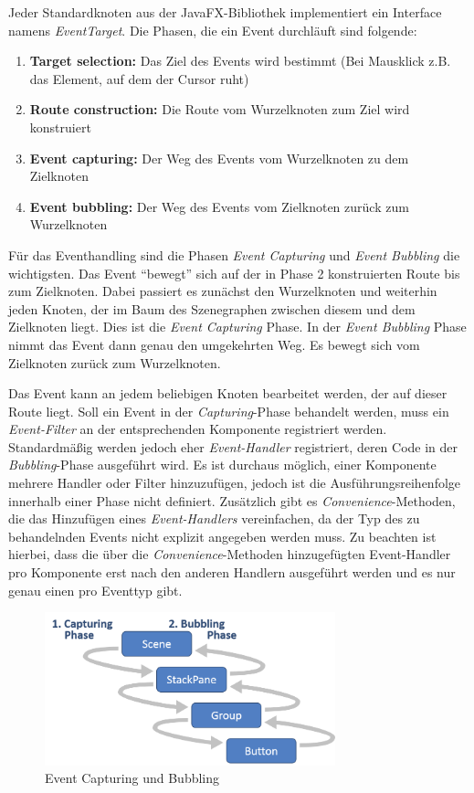 Jeder Standardknoten aus der JavaFX-Bibliothek implementiert ein Interface namens \textit{EventTarget}. Die Phasen, die ein Event durchläuft sind folgende:
\begin{enumerate}
	\item \textbf{Target selection:} Das Ziel des Events wird bestimmt (Bei Mausklick z.B. das Element, auf dem der Cursor ruht)
	\item \textbf{Route construction:} Die Route vom Wurzelknoten zum Ziel wird konstruiert
	\item \textbf{Event capturing:} Der Weg des Events vom Wurzelknoten zu dem Zielknoten
	\item \textbf{Event bubbling:} Der Weg des Events vom Zielknoten zurück zum Wurzelknoten
\end{enumerate}
Für das Eventhandling sind die Phasen \textit{Event Capturing} und \textit{Event Bubbling} die wichtigsten. Das Event \enquote{bewegt} sich auf der in Phase 2 konstruierten Route bis zum Zielknoten. Dabei passiert es zunächst den Wurzelknoten und weiterhin jeden Knoten, der im Baum des Szenegraphen zwischen diesem und dem Zielknoten liegt. Dies ist die \textit{Event Capturing} Phase. In der \textit{Event Bubbling} Phase nimmt das Event dann genau den umgekehrten Weg. Es bewegt sich vom Zielknoten zurück zum Wurzelknoten.\par
Das Event kann an jedem beliebigen Knoten bearbeitet werden, der auf dieser Route liegt. Soll ein Event in der \textit{Capturing}-Phase behandelt werden, muss ein \textit{Event-Filter} an der entsprechenden Komponente registriert werden. Standardmäßig werden jedoch eher \textit{Event-Handler} registriert, deren Code in der \textit{Bubbling}-Phase ausgeführt wird. Es ist durchaus möglich, einer Komponente mehrere Handler oder Filter hinzuzufügen, jedoch ist die Ausführungsreihenfolge innerhalb einer Phase nicht definiert. Zusätzlich gibt es \textit{Convenience}-Methoden, die das Hinzufügen eines \textit{Event-Handlers} vereinfachen, da der Typ des zu behandelnden Events nicht explizit angegeben werden muss. Zu beachten ist hierbei, dass die über die \textit{Convenience}-Methoden hinzugefügten Event-Handler pro Komponente erst nach den anderen Handlern ausgeführt werden und es nur genau einen pro Eventtyp gibt.\par
\begin{figure}[H]
 \centering
 \includegraphics[width=0.75\textwidth]{grafiken/event_phase.png}
 \caption{Event Capturing und Bubbling}
 \label{fig:eventPhase}
\end{figure} 
